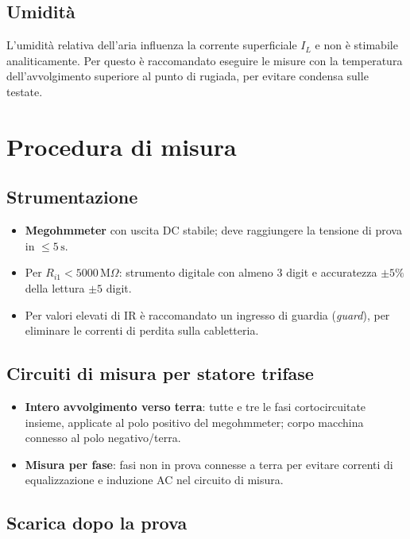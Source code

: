 \documentclass[a4paper,11pt]{article}
\begin{document}
\subsection{Umidità}

L'umidità relativa dell'aria influenza la corrente superficiale $I_L$ e non è stimabile analiticamente. Per questo è raccomandato eseguire le misure con la temperatura dell'avvolgimento superiore al punto di rugiada, per evitare condensa sulle testate.

\section{Procedura di misura}

\subsection{Strumentazione}

\begin{itemize}
  \item \textbf{Megohmmeter} con uscita DC stabile; deve raggiungere la tensione di prova in $\leq 5\,\text{s}$.
  \item Per $R_{i1} < 5000\,\text{M}\Omega$: strumento digitale con almeno 3 digit e accuratezza $\pm5\%$ della lettura $\pm5$ digit.
  \item Per valori elevati di IR è raccomandato un ingresso di guardia (\emph{guard}), per eliminare le correnti di perdita sulla cabletteria.
\end{itemize}

\subsection{Circuiti di misura per statore trifase}

\begin{itemize}
  \item \textbf{Intero avvolgimento verso terra}: tutte e tre le fasi cortocircuitate insieme, applicate al polo positivo del megohmmeter; corpo macchina connesso al polo negativo/terra.
  \item \textbf{Misura per fase}: fasi non in prova connesse a terra per evitare correnti di equalizzazione e induzione AC nel circuito di misura.
\end{itemize}

\subsection{Scarica dopo la prova}
\end{document}
